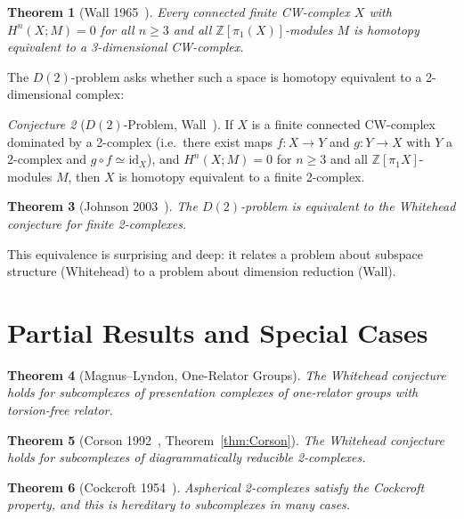 \documentclass[12pt,a4paper]{amsart}
\newtheorem{theorem}{Theorem}[section]
\theoremstyle{definition}
\theoremstyle{remark}
\newtheorem{conjecture}[theorem]{Conjecture}
\newcommand{\Z}{\mathbb{Z}}
\begin{document}
\begin{theorem}[Wall 1965~\cite{Wall1965}]
Every connected finite CW-complex $X$ with $H^n(X; M) = 0$ for all
$n \geq 3$ and all $\Z[\pi_1(X)]$-modules $M$ is homotopy equivalent
to a 3-dimensional CW-complex.
\end{theorem}

The $D(2)$-problem asks whether such a space is homotopy equivalent to a
2-dimensional complex:

\begin{conjecture}[$D(2)$-Problem, Wall~\cite{Wall1965}]
\label{conj:D2}
If $X$ is a finite connected CW-complex dominated by a 2-complex (i.e.\ there
exist maps $f \colon X \to Y$ and $g \colon Y \to X$ with $Y$ a 2-complex
and $g \circ f \simeq \mathrm{id}_X$), and $H^n(X; M) = 0$ for $n \geq 3$
and all $\Z[\pi_1 X]$-modules $M$, then $X$ is homotopy equivalent to a
finite 2-complex.
\end{conjecture}

\begin{theorem}[Johnson 2003~\cite{Johnson2003}]
The $D(2)$-problem is equivalent to the Whitehead conjecture for finite
2-complexes.
\end{theorem}

This equivalence is surprising and deep: it relates a problem about
subspace structure (Whitehead) to a problem about dimension reduction (Wall).

\section{Partial Results and Special Cases}

\begin{theorem}[Magnus--Lyndon, One-Relator Groups]
The Whitehead conjecture holds for subcomplexes of presentation complexes
of one-relator groups with torsion-free relator.
\end{theorem}

\begin{theorem}[Corson 1992~\cite{Corson1992}, Theorem~\ref{thm:Corson}]
The Whitehead conjecture holds for subcomplexes of diagrammatically
reducible 2-complexes.
\end{theorem}

\begin{theorem}[Cockcroft 1954~\cite{Cockcroft1954}]
Aspherical 2-complexes satisfy the Cockcroft property, and this is
hereditary to subcomplexes in many cases.
\end{theorem}
\end{document}
